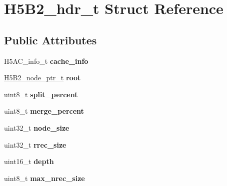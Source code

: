 \hypertarget{struct_h5_b2__hdr__t}{}\section{H5\+B2\+\_\+hdr\+\_\+t Struct Reference}
\label{struct_h5_b2__hdr__t}
\subsection*{Public Attributes}
\begin{DoxyCompactItemize}
\item 
\mbox{\label{struct_h5_b2__hdr__t_af7528ecbe150774c71e061232ae1a997}} 
H5\+A\+C\+\_\+info\+\_\+t {\bfseries cache\+\_\+info}
\item 
\mbox{\label{struct_h5_b2__hdr__t_a2202b1cdac0b1a7297ab4f9ed6e15dea}} 
\hyperlink{struct_h5_b2__node__ptr__t}{H5\+B2\+\_\+node\+\_\+ptr\+\_\+t} {\bfseries root}
\item 
\mbox{\label{struct_h5_b2__hdr__t_a6299e2a5b2f0ca5c5e36247f57c850e6}} 
uint8\+\_\+t {\bfseries split\+\_\+percent}
\item 
\mbox{\label{struct_h5_b2__hdr__t_a0fd1a42fbe570395a24392260c2fab03}} 
uint8\+\_\+t {\bfseries merge\+\_\+percent}
\item 
\mbox{\label{struct_h5_b2__hdr__t_ac29ce00249defd97ffc38bc56efc4448}} 
uint32\+\_\+t {\bfseries node\+\_\+size}
\item 
\mbox{\label{struct_h5_b2__hdr__t_afedabecb45f099ef4df085e5f9246ff4}} 
uint32\+\_\+t {\bfseries rrec\+\_\+size}
\item 
\mbox{\label{struct_h5_b2__hdr__t_ab59b7b0ab5bf5ff1a854b5277e6fd990}} 
uint16\+\_\+t {\bfseries depth}
\item 
\mbox{\label{struct_h5_b2__hdr__t_a1991fdf240183304dc8cfbc6ace9ad26}} 
uint8\+\_\+t {\bfseries max\+\_\+nrec\+\_\+size}
\item 
\mbox{\label{struct_h5_b2__hdr__t_a50d26679f30bd8d2eb63bf32e337feba}} 

\end{DoxyCompactItemize}
